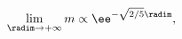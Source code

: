 \begin{equation}
\label{eq:mF}
\lim_{\radim \to + \infty} m \propto \ee^{-\sqrt{2/5} \radim},
\end{equation}

